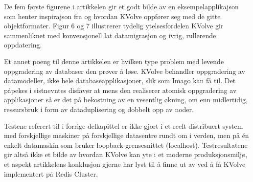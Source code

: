 De fem første figurene i artikkelen gir et godt bilde av en eksempelapplikajson som henter inspirajson fra \cite{sadalage2013} og hvordan KVolve oppfører seg med de gitte objektformater. Figur 6 og 7 illustrerer tydelig ytelsesfordelen KVolve gir sammenliknet med konvensjonell lat datamigrasjon og ivrig, rullerende oppdatering.

Et annet poeng til denne artikkelen er hvilken type problem med levende oppgradering av databaser den prøver å løse. KVolve behandler oppgradering av datamodeller, ikke hele databaseapplikasjoner, slik som Imago kan få til. Det påpekes i sistnevntes disfavør at mens den realiserer atomisk oppgradering av applikasjoner så er det på bekostning av en vesentlig økning, om enn midlertidig, ressursbruk i form av dataduplisering og dobbelt opp av noder.

Testene referert til i forrige delkapittel er ikke gjort i et reelt distribuert system med forskjellige maskiner på forskjellige datasentre rundt om i verden, men på én enkelt datamaskin som bruker loopback-grensesnittet (localhost). Testresultatene gir altså ikke et bilde av hvordan KVolve kan yte i et moderne produksjonsmiljø, et aspekt artikkelens konklusjon gjerne har lyst til å finne ut av ved å få KVolve implementert på Redis Cluster.

